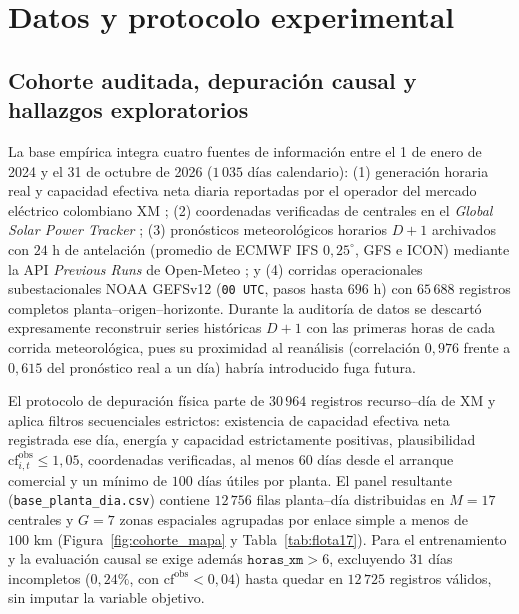 \section{Datos y protocolo experimental}\label{sec:datos}

\subsection{Cohorte auditada, depuración causal y hallazgos exploratorios}

La base empírica integra cuatro fuentes de información entre el 1 de enero de 2024 y el 31 de octubre de 2026 ($1\,035$ días calendario): (1) generación horaria real y capacidad efectiva neta diaria reportadas por el operador del mercado eléctrico colombiano XM \cite{xm2026api}; (2) coordenadas verificadas de centrales en el \textit{Global Solar Power Tracker} \cite{gem2026solar}; (3) pronósticos meteorológicos horarios $D+1$ archivados con $24\text{ h}$ de antelación (promedio de ECMWF IFS $0{,}25^\circ$, GFS e ICON) mediante la API \textit{Previous Runs} de Open-Meteo \cite{openmeteoPreviousRuns}; y (4) corridas operacionales subestacionales NOAA GEFSv12 (\texttt{00~UTC}, pasos hasta $696\text{ h}$) con $65\,688$ registros completos planta--origen--horizonte. Durante la auditoría de datos se descartó expresamente reconstruir series históricas $D+1$ con las primeras horas de cada corrida meteorológica, pues su proximidad al reanálisis (correlación $0{,}976$ frente a $0{,}615$ del pronóstico real a un día) habría introducido fuga futura.

El protocolo de depuración física \cite{nist2003eda,pipino2002quality,jensen2024solarqc} parte de $30\,964$ registros recurso--día de XM y aplica filtros secuenciales estrictos: existencia de capacidad efectiva neta registrada ese día, energía y capacidad estrictamente positivas, plausibilidad $\mathrm{cf}^{\mathrm{obs}}_{i,t} \le 1{,}05$, coordenadas verificadas, al menos $60$ días desde el arranque comercial y un mínimo de $100$ días útiles por planta. El panel resultante (\texttt{base\_planta\_dia.csv}) contiene $12\,756$ filas planta--día distribuidas en $M=17$ centrales y $G=7$ zonas espaciales agrupadas por enlace simple a menos de $100\text{ km}$ (Figura~\ref{fig:cohorte_mapa} y Tabla~\ref{tab:flota17}). Para el entrenamiento y la evaluación causal se exige además $\texttt{horas\_xm} > 6$, excluyendo $31$ días incompletos ($0{,}24\%$, con $\mathrm{cf}^{\mathrm{obs}} < 0{,}04$) hasta quedar en $12\,725$ registros válidos, sin imputar la variable objetivo.

